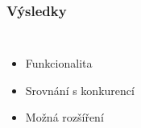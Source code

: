 \documentclass[10pt,xcolor=pdflatex]{beamer}
\begin{document}
\begin{frame}\frametitle{Výsledky}
    \begin{columns}
            \begin{itemize}
                \item {Funkcionalita}
                \item {Srovnání s konkurencí}
                \item {Možná rozšíření}
            \end{itemize}
    \end{columns}
\end{frame}
\end{document}
